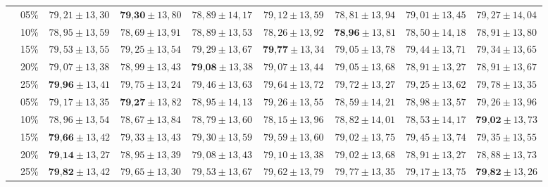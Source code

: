 \begin{table}[h]
{\begin{tabular}{|c|c|c|c|c|c|c|c|c|}
                 & 05\% & $79,21 \pm 13,30$ & $\textbf{79,30} \pm 13,80$ & $78,89 \pm 14,17$ & $79,12 \pm 13,59$ & $78,81 \pm 13,94$ & $79,01 \pm 13,45$ & $79,27 \pm 14,04$ \\
                 & 10\% & $78,95 \pm 13,59$ & $78,69 \pm 13,91$ & $78,89 \pm 13,53$ & $78,26 \pm 13,92$ & $\textbf{78,96} \pm 13,81$ & $78,50 \pm 14,18$ & $78,91 \pm 13,80$ \\
                 & 15\% & $79,53 \pm 13,55$ & $79,25 \pm 13,54$ & $79,29 \pm 13,67$ & $\textbf{79,77} \pm 13,34$ & $79,05 \pm 13,78$ & $79,44 \pm 13,71$ & $79,34 \pm 13,65$ \\
                 & 20\% & $79,07 \pm 13,38$ & $78,99 \pm 13,43$ & $\textbf{79,08} \pm 13,38$ & $79,07 \pm 13,44$ & $79,05 \pm 13,68$ & $78,91 \pm 13,27$ & $78,91 \pm 13,67$ \\
                 & 25\% & $\textbf{79,96} \pm 13,41$ & $79,75 \pm 13,24$ & $79,46 \pm 13,63$ & $79,64 \pm 13,72$ & $79,72 \pm 13,27$ & $79,25 \pm 13,62$ & $79,78 \pm 13,35$ \\ \hline
                \parbox[t]{3mm}{}
                 & 05\% & $79,17 \pm 13,35$ & $\textbf{79,27} \pm 13,82$ & $78,95 \pm 14,13$ & $79,26 \pm 13,55$ & $78,59 \pm 14,21$ & $78,98 \pm 13,57$ & $79,26 \pm 13,96$ \\
                 & 10\% & $78,96 \pm 13,54$ & $78,67 \pm 13,84$ & $78,79 \pm 13,60$ & $78,15 \pm 13,96$ & $78,82 \pm 14,01$ & $78,53 \pm 14,17$ & $\textbf{79,02} \pm 13,73$ \\
                 & 15\% & $\textbf{79,66} \pm 13,42$ & $79,33 \pm 13,43$ & $79,30 \pm 13,59$ & $79,59 \pm 13,60$ & $79,02 \pm 13,75$ & $79,45 \pm 13,74$ & $79,35 \pm 13,55$ \\
                 & 20\% & $\textbf{79,14} \pm 13,27$ & $78,95 \pm 13,39$ & $79,08 \pm 13,43$ & $79,10 \pm 13,38$ & $79,02 \pm 13,68$ & $78,91 \pm 13,27$ & $78,88 \pm 13,73$ \\
                 & 25\% & $\textbf{79,82} \pm 13,42$ & $79,65 \pm 13,30$ & $79,53 \pm 13,67$ & $79,62 \pm 13,79$ & $79,77 \pm 13,35$ & $79,17 \pm 13,75$ & $\textbf{79,82} \pm 13,26$ \\ \hline
            \end{tabular}%
        }
        \label{tab:knn-acc}
    \end{table}
    
